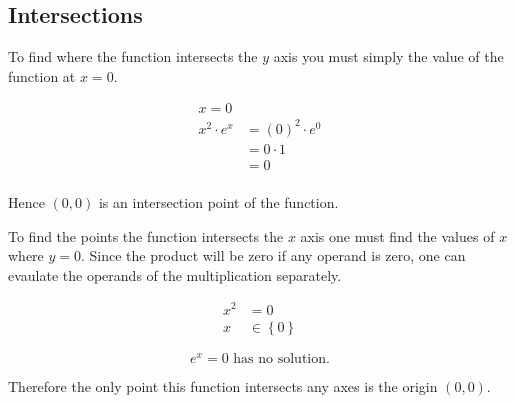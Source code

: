 \subsection{Intersections}

To find where the function intersects the $y$ axis you must simply
the value of the function at \(x = 0\).

\[
    \begin{aligned}
        x = 0 & \\
        x^2\cdot e^x & = (0)^2 \cdot e^0 \\
        & = 0\cdot 1 \\
        & = 0 \\
    \end{aligned}
\]

Hence \((0,0)\) is an intersection point of the function.

To find the points the function intersects the $x$ axis one must find the values
of $x$ where $y = 0$. Since the product will be zero if any operand is zero,
one can evaulate the operands of the multiplication separately.

\[
    \begin{aligned}
        x^2 & = 0 \\
        x & \in \left\{0\right\}
    \end{aligned}
\]

\[
    e^x = 0 \text{ has no solution.}
\]

Therefore the only point this function intersects any axes is the origin \((0,0)\).